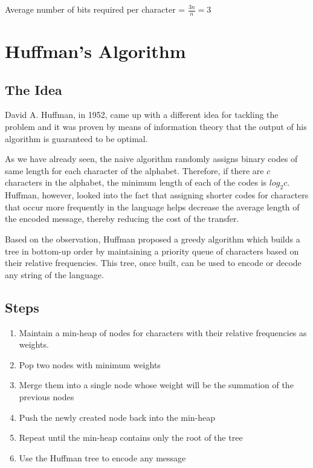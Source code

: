 \documentclass[18pt]{article}
\begin{document}
Average number of bits required per character = $\frac{3n}{n} = 3$

\newpage

\section{Huffman's Algorithm}

\subsection{The Idea}

David A. Huffman, in 1952, came up with a different idea for tackling the problem and it was proven by means of information theory that the output of his algorithm is guaranteed to be optimal. 

As we have already seen, the naive algorithm randomly assigns binary codes of same length for each character of the alphabet. Therefore, if there are $c$ characters in the alphabet, the minimum length of each of the codes is $log_{2}{c}$. Huffman, however, looked into the fact that assigning shorter codes for characters that occur more frequently in the language helps decrease the
average length of the encoded message, thereby reducing the cost of the transfer.

Based on the observation, Huffman proposed a greedy algorithm which builds a tree in bottom-up order by maintaining a priority queue of characters based on their relative frequencies. This tree, once built, can be used to encode or decode any string of the language.

\subsection{Steps}

\begin{enumerate}
	\item Maintain a min-heap of nodes for characters with their relative frequencies as weights. 
	
	\item Pop two nodes with minimum weights 
	
	\item Merge them into a single node whose weight will be the summation of the previous nodes
	
	\item Push the newly created node back into the min-heap
	
	\item Repeat until the min-heap contains only the root of the tree
	
	\item Use the Huffman tree to encode any message
	
\end{enumerate}
\end{document}
